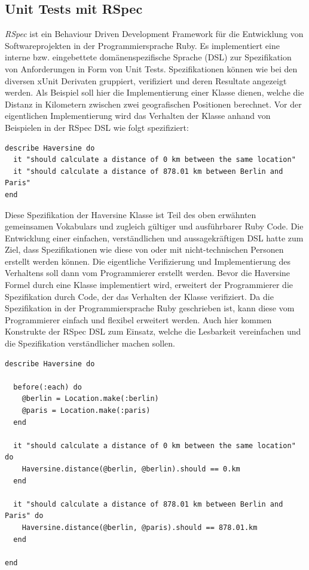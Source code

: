\subsection{Unit Tests mit RSpec}

\textit{RSpec} \cite{rspec} ist ein Behaviour Driven Development
Framework für die Entwicklung von Softwareprojekten in der
Programmiersprache Ruby.  Es implementiert eine interne
bzw. eingebettete domänen\-spezifische Sprache (DSL) zur Spezifikation
von Anforderungen in Form von Unit Tests.  Spezifikationen können wie
bei den diversen xUnit Derivaten gruppiert, verifiziert und deren
Resultate angezeigt werden. Als Beispiel soll hier die Implementierung
einer Klasse dienen, welche die Distanz in Kilometern zwischen zwei
geografischen Positionen berechnet. Vor der eigentlichen
Implementierung wird das Verhalten der Klasse anhand von Beispielen in
der RSpec DSL wie folgt spezifiziert:

\begin{lstlisting}
describe Haversine do
  it "should calculate a distance of 0 km between the same location"
  it "should calculate a distance of 878.01 km between Berlin and Paris"
end
\end{lstlisting}

Diese Spezifikation der Haversine Klasse ist Teil des oben erwähnten
gemeinsamen Vokabulars und zugleich gültiger und ausführbarer Ruby
Code. Die Entwicklung einer einfachen, verständlichen und
aussagekräftigen DSL hatte zum Ziel, dass Spezifikationen wie diese
von oder mit nicht-technischen Personen erstellt werden können. Die
eigentliche Verifizierung und Implementierung des Verhaltens soll dann
vom Programmierer erstellt werden. Bevor die Haversine Formel durch
eine Klasse implementiert wird, erweitert der Programmierer die
Spezifikation durch Code, der das Verhalten der Klasse verifiziert. Da
die Spezifikation in der Programmiersprache Ruby geschrieben ist, kann
diese vom Programmierer einfach und flexibel erweitert werden. Auch
hier kommen Konstrukte der RSpec DSL zum Einsatz, welche die
Lesbarkeit vereinfachen und die Spezifikation verständlicher machen
sollen.

\begin{lstlisting}
describe Haversine do

  before(:each) do
    @berlin = Location.make(:berlin)
    @paris = Location.make(:paris)
  end

  it "should calculate a distance of 0 km between the same location" do
    Haversine.distance(@berlin, @berlin).should == 0.km
  end

  it "should calculate a distance of 878.01 km between Berlin and Paris" do
    Haversine.distance(@berlin, @paris).should == 878.01.km
  end

end
\end{lstlisting}

